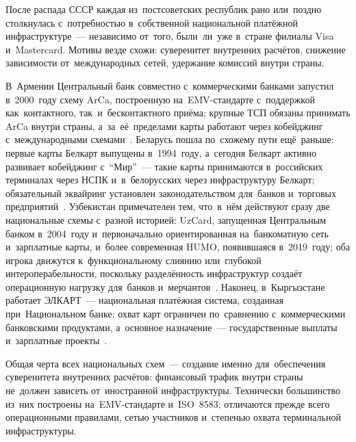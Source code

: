 После распада СССР каждая из~постсоветских республик рано или~поздно
столкнулась с~потребностью в~собственной национальной платёжной
инфраструктуре~--- независимо от~того, были~ли~уже в~стране филиалы
Visa и~Mastercard. Мотивы везде схожи: суверенитет внутренних расчётов,
снижение зависимости от~международных сетей, удержание комиссий внутри страны.

В~Армении Центральный банк совместно с~коммерческими банками запустил
в~2000~году схему ArCa, построенную на~EMV-стандарте с~поддержкой
как~контактного, так~и~бесконтактного приёма; крупные ТСП обязаны
принимать ArCa внутри страны, а~за~её~пределами карты работают
через кобейджинг с~международными схемами~. Беларусь пошла по~схожему пути ещё~раньше:
первые карты Белкарт выпущены в~1994~году, а~сегодня Белкарт активно
развивает кобейджинг с~\enquote{Мир}~--- такие карты принимаются
в~российских терминалах через НСПК и~в~белорусских через инфраструктуру
Белкарт; обязательный эквайринг установлен законодательством для~банков
и~торговых предприятий~. Узбекистан примечателен тем, что~в~нём действуют сразу две
национальные схемы с~разной историей: UzCard, запущенная Центральным
банком в~2004~году и~первоначально ориентированная на~банкоматную сеть
и~зарплатные карты, и~более современная HUMO, появившаяся в~2019~году;
оба игрока движутся к~функциональному слиянию или~глубокой
интероперабельности, поскольку разделённость инфраструктур создаёт
операционную нагрузку для~банков и~мерчантов~. Наконец, в~Кыргызстане работает ЭЛКАРТ~---
национальная платёжная система, созданная при~Национальном банке; охват
карт ограничен по~сравнению с~коммерческими банковскими продуктами,
а~основное назначение~--- государственные выплаты и~зарплатные
проекты~.


Общая черта всех национальных схем~--- создание именно для~обеспечения
суверенитета внутренних расчётов: финансовый трафик внутри страны
не~должен зависеть от~иностранной инфраструктуры. Технически большинство
из~них построены на~EMV-стандарте и~ISO~8583; отличаются прежде всего
операционными правилами, сетью участников и~степенью охвата терминальной
инфраструктуры.



